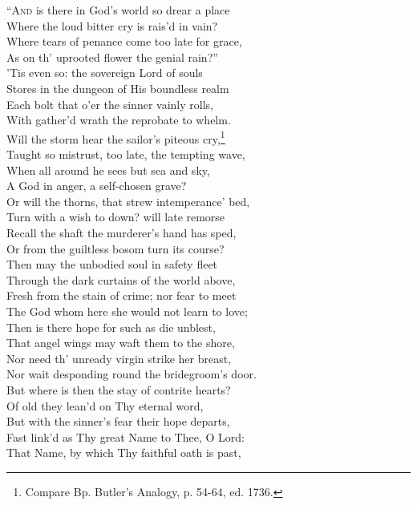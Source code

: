 “\textsc{And} is there in God’s world so drear a place \\
 Where the loud bitter cry is rais’d in vain? \\
 Where tears of penance come too late for grace, \\
 As on th’ uprooted flower the genial rain?” \\
  ’Tis even so: the sovereign Lord of souls \\
 Stores in the dungeon of His boundless realm \\
 Each bolt that o’er the sinner vainly rolls, \\
 With gather’d wrath the reprobate to whelm. \\
  Will the storm hear the sailor’s piteous cry,\footnote{Compare Bp. Butler’s Analogy, p. 54-64, ed. 1736.} \\
 Taught so mistrust, too late, the tempting wave, \\
 When all around he sees but sea and sky, \\
 A God in anger, a self-chosen grave? \\
  Or will the thorns, that strew intemperance’ bed, \\
 Turn with a wish to down? will late remorse \\
 Recall the shaft the murderer’s hand has sped, \\
 Or from the guiltless bosom turn its course? \\
  Then may the unbodied soul in safety fleet \\
 Through the dark curtains of the world above, \\
 Fresh from the stain of crime; nor fear to meet \\
 The God whom here she would not learn to love; \\
  Then is there hope for such as die unblest, \\
 That angel wings may waft them to the shore, \\
 Nor need th’ unready virgin strike her breast, \\
 Nor wait desponding round the bridegroom’s door. \\
  But where is then the stay of contrite hearts? \\
 Of old they lean’d on Thy eternal word, \\
 But with the sinner’s fear their hope departs, \\
 Fast link’d as Thy great Name to Thee, O Lord: \\
  That Name, by which Thy faithful oath is past, \\
